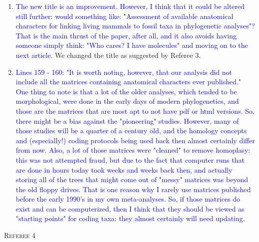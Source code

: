 \documentclass[12pt,letterpaper]{article}
\renewcommand{\section}[1]{%
\bigskip
\begin{center}
\begin{Large}
\normalfont\scshape #1
\medskip
\end{Large}
\end{center}}
\begin{document}
\begin{enumerate}
\item{\textcolor{blue}{The new title is an improvement.  However, I think that it could be altered still further: would something like: "Assessment of available anatomical characters for linking living mammals to fossil taxa in phylogenetic analyses"?  That is the main thrust of the paper, after all, and it also avoids having someone simply think: "Who cares? I have molecules" and moving on to the next article.}}
We changed the title as suggested by Referee 3.

\item{\textcolor{blue}{Lines 159 - 160: "It is worth noting, however, that our analysis did not include all the matrices containing anatomical characters ever published."
One thing to note is that a lot of the older analyses, which tended to be morphological, were done in the early days of modern phylogenetics, and those are the matrices that are most apt to not have pdf or html versions.  So, there might be a bias against the "pioneering" studies.  However, many of those studies will be a quarter of a century old, and the homology concepts and (especially!) coding protocols being used back then almost certainly differ from now.  Also, a lot of those matrices were "cleaned" to remove homoplasy: this was not attempted fraud, but due to the fact that computer runs that are done in hours today took weeks and weeks back then, and actually storing all of the trees that might come out of "messy" matrices was beyond the old floppy drives.  That is one reason why I rarely use matrices published before the early 1990's in my own meta-analyses.  So, if those matrices do exist and can be computerized, then I think that they should be viewed as "starting points" for coding taxa: they almost certainly will need updating.}}


\end{enumerate}

\section{Referee 4}
\end{document}
